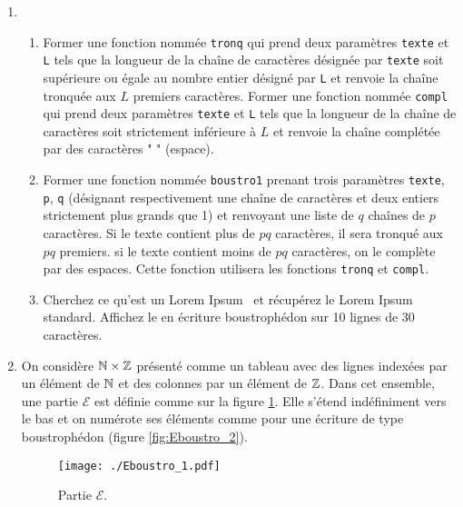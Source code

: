 \begin{enumerate}
 \item 
\begin{enumerate}
 \item Former une fonction nommée \verb|tronq| qui prend deux paramètres \verb|texte| et \verb|L| tels que la longueur de la chaîne de caractères désignée par \verb|texte| soit supérieure ou égale au nombre entier désigné par \verb|L| et renvoie la chaîne tronquée aux $L$ premiers caractères.\newline
 Former une fonction nommée \verb|compl| qui prend deux paramètres \verb|texte| et \verb|L| tels que la longueur de la chaîne de caractères soit strictement inférieure à $L$ et renvoie la chaîne complétée par des caractères " " (espace). 

 \item  Former une fonction nommée \verb|boustro1| prenant trois paramètres \verb|texte|, \verb|p|, \verb|q| (désignant respectivement une chaîne de caractères et deux entiers strictement plus grands que 1) et renvoyant une liste de $q$ chaînes de $p$ caractères. Si le texte contient plus de $pq$ caractères, il sera tronqué aux $pq$ premiers. si le texte contient moins de $pq$ caractères, on le complète par des espaces. Cette fonction utilisera les fonctions \verb|tronq| et \verb|compl|. 

 \item Cherchez ce qu'est un \og Lorem Ipsum \fg \ et récupérez le Lorem Ipsum standard. Affichez le en écriture boustrophédon sur 10 lignes de 30 caractères.
 \end{enumerate}

\item On considère $\mathbb{N} \times \mathbb{Z}$ présenté comme un tableau avec des lignes indexées par un élément de $\mathbb{N}$ et des colonnes par un élément de $\mathbb{Z}$. Dans cet ensemble, une partie $\mathcal{E}$ est définie comme sur la figure \ref{fig:Eboustro_1}. Elle s'étend indéfiniment vers le bas et on numérote ses éléments comme pour une écriture de type boustrophédon (figure \ref{fig:Eboustro_2}).

\begin{figure}
  \centering
  \texttt{[image: ./Eboustro\_1.pdf]}
  \caption{Partie $\mathcal{E}$.}
  \label{fig:Eboustro_1}
\end{figure}


\end{enumerate}
